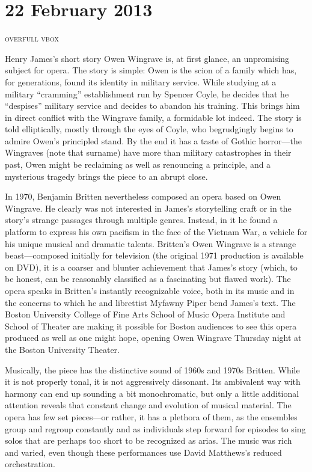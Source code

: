 \chapter{22 February 2013}

\textsc{overfull vbox}

Henry James’s short story Owen Wingrave is, at first glance, an unpromising subject for opera. The story is simple: Owen is the scion of a family which has, for generations, found its identity in military service. While studying at a military “cramming” establishment run by Spencer Coyle, he decides that he “despises” military service and decides to abandon his training. This brings him in direct conflict with the Wingrave family, a formidable lot indeed. The story is told elliptically, mostly through the eyes of Coyle, who begrudgingly begins to admire Owen’s principled stand. By the end it has a taste of Gothic horror—the Wingraves (note that surname) have more than military catastrophes in their past, Owen might be reclaiming as well as renouncing a principle, and a mysterious tragedy brings the piece to an abrupt close.

In 1970, Benjamin Britten nevertheless composed an opera based on Owen Wingrave. He clearly was not interested in James’s storytelling craft or in the story’s strange passages through multiple genres. Instead, in it he found a platform to express his own pacifism in the face of the Vietnam War, a vehicle for his unique musical and dramatic talents. Britten’s Owen Wingrave is a strange beast—composed initially for television (the original 1971 production is available on DVD), it is a coarser and blunter achievement that James’s story (which, to be honest, can be reasonably classified as a fascinating but flawed work). The opera speaks in Britten’s instantly recognizable voice, both in its music and in the concerns to which he and librettist Myfawny Piper bend James’s text. The Boston University College of Fine Arts School of Music Opera Institute and School of Theater are making it possible for Boston audiences to see this opera produced as well as one might hope, opening Owen Wingrave Thursday night at the Boston University Theater.

Musically, the piece has the distinctive sound of 1960s and 1970s Britten. While it is not properly tonal, it is not aggressively dissonant. Its ambivalent way with harmony can end up sounding a bit monochromatic, but only a little additional attention reveals that constant change and evolution of musical material. The opera has few set pieces—or rather, it has a plethora of them, as the ensembles group and regroup constantly and as individuals step forward for episodes to sing solos that are perhaps too short to be recognized as arias. The music was rich and varied, even though these performances use David Matthews’s reduced orchestration.

